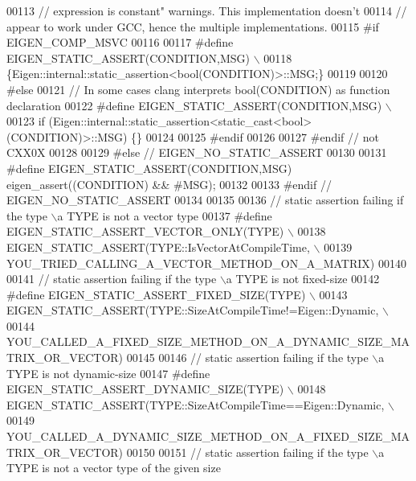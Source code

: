 \begin{DoxyCode}
00113     \textcolor{comment}{// expression is constant" warnings.  This implementation doesn't}
00114     \textcolor{comment}{// appear to work under GCC, hence the multiple implementations.}
00115 \textcolor{preprocessor}{    #if EIGEN\_COMP\_MSVC}
00116 
00117 \textcolor{preprocessor}{      #define EIGEN\_STATIC\_ASSERT(CONDITION,MSG) \(\backslash\)}
00118 \textcolor{preprocessor}{        \{Eigen::internal::static\_assertion<bool(CONDITION)>::MSG;\}}
00119 
00120 \textcolor{preprocessor}{    #else}
00121       \textcolor{comment}{// In some cases clang interprets bool(CONDITION) as function declaration}
00122 \textcolor{preprocessor}{      #define EIGEN\_STATIC\_ASSERT(CONDITION,MSG) \(\backslash\)}
00123 \textcolor{preprocessor}{        if (Eigen::internal::static\_assertion<static\_cast<bool>(CONDITION)>::MSG) \{\}}
00124 
00125 \textcolor{preprocessor}{    #endif}
00126 
00127 \textcolor{preprocessor}{  #endif // not CXX0X}
00128 
00129 \textcolor{preprocessor}{#else // EIGEN\_NO\_STATIC\_ASSERT}
00130 
00131 \textcolor{preprocessor}{  #define EIGEN\_STATIC\_ASSERT(CONDITION,MSG) eigen\_assert((CONDITION) && #MSG);}
00132 
00133 \textcolor{preprocessor}{#endif // EIGEN\_NO\_STATIC\_ASSERT}
00134 
00135 
00136 \textcolor{comment}{// static assertion failing if the type \(\backslash\)a TYPE is not a vector type}
00137 \textcolor{preprocessor}{#define EIGEN\_STATIC\_ASSERT\_VECTOR\_ONLY(TYPE) \(\backslash\)}
00138 \textcolor{preprocessor}{  EIGEN\_STATIC\_ASSERT(TYPE::IsVectorAtCompileTime, \(\backslash\)}
00139 \textcolor{preprocessor}{                      YOU\_TRIED\_CALLING\_A\_VECTOR\_METHOD\_ON\_A\_MATRIX)}
00140 
00141 \textcolor{comment}{// static assertion failing if the type \(\backslash\)a TYPE is not fixed-size}
00142 \textcolor{preprocessor}{#define EIGEN\_STATIC\_ASSERT\_FIXED\_SIZE(TYPE) \(\backslash\)}
00143 \textcolor{preprocessor}{  EIGEN\_STATIC\_ASSERT(TYPE::SizeAtCompileTime!=Eigen::Dynamic, \(\backslash\)}
00144 \textcolor{preprocessor}{                      YOU\_CALLED\_A\_FIXED\_SIZE\_METHOD\_ON\_A\_DYNAMIC\_SIZE\_MATRIX\_OR\_VECTOR)}
00145 
00146 \textcolor{comment}{// static assertion failing if the type \(\backslash\)a TYPE is not dynamic-size}
00147 \textcolor{preprocessor}{#define EIGEN\_STATIC\_ASSERT\_DYNAMIC\_SIZE(TYPE) \(\backslash\)}
00148 \textcolor{preprocessor}{  EIGEN\_STATIC\_ASSERT(TYPE::SizeAtCompileTime==Eigen::Dynamic, \(\backslash\)}
00149 \textcolor{preprocessor}{                      YOU\_CALLED\_A\_DYNAMIC\_SIZE\_METHOD\_ON\_A\_FIXED\_SIZE\_MATRIX\_OR\_VECTOR)}
00150 
00151 \textcolor{comment}{// static assertion failing if the type \(\backslash\)a TYPE is not a vector type of the given size}

\end{DoxyCode}
